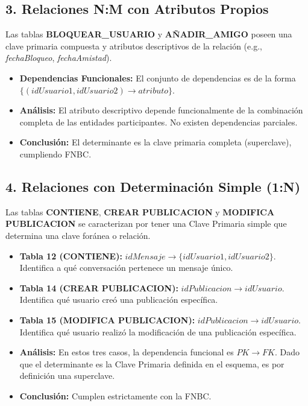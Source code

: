 \subsection*{3. Relaciones N:M con Atributos Propios}
Las tablas \textbf{BLOQUEAR\_USUARIO} y \textbf{AÑADIR\_AMIGO} poseen una clave primaria compuesta y atributos descriptivos de la relación (e.g., \textit{fechaBloqueo}, \textit{fechaAmistad}).

\begin{itemize}
    \item \textbf{Dependencias Funcionales:} El conjunto de dependencias es de la forma $\{ (idUsuario1, idUsuario2) \to atributo \}$.
    \item \textbf{Análisis:} El atributo descriptivo depende funcionalmente de la combinación completa de las entidades participantes. No existen dependencias parciales.
    \item \textbf{Conclusión:} El determinante es la clave primaria completa (superclave), cumpliendo FNBC.
\end{itemize}

\subsection*{4. Relaciones con Determinación Simple (1:N)}
Las tablas \textbf{CONTIENE}, \textbf{CREAR PUBLICACION} y \textbf{MODIFICA PUBLICACION} se caracterizan por tener una Clave Primaria simple que determina una clave foránea o relación.

\begin{itemize}
    \item \textbf{Tabla 12 (CONTIENE):} $idMensaje \to \{idUsuario1, idUsuario2\}$. Identifica a qué conversación pertenece un mensaje único.
    \item \textbf{Tabla 14 (CREAR PUBLICACION):} $idPublicacion \to idUsuario$. Identifica qué usuario creó una publicación específica.
    \item \textbf{Tabla 15 (MODIFICA PUBLICACION):} $idPublicacion \to idUsuario$. Identifica qué usuario realizó la modificación de una publicación específica.
    \item \textbf{Análisis:} En estos tres casos, la dependencia funcional es $PK \to FK$. Dado que el determinante es la Clave Primaria definida en el esquema, es por definición una superclave.
    \item \textbf{Conclusión:} Cumplen estrictamente con la FNBC.
\end{itemize}